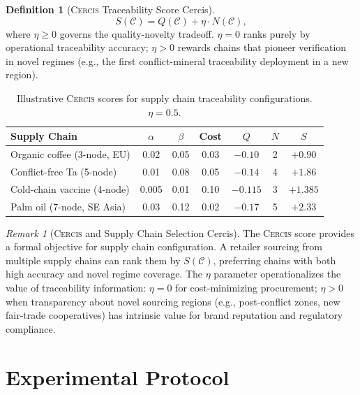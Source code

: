 \documentclass[11pt,a4paper]{article}
\theoremstyle{definition}
\newtheorem{definition}[theorem]{Definition}
\theoremstyle{remark}
\newtheorem{remark}[theorem]{Remark}
\newcommand{\Cercis}{\textsc{Cercis}}
\newcommand{\chain}{\mathcal{C}}
\begin{document}
\begin{definition}[\Cercis{} Traceability Score Cercis]
\label{def:cercis_traceability}
\begin{equation}
    S(\chain) = Q(\chain) + \eta \cdot N(\chain),
    \label{eq:cercis_traceability}
\end{equation}
where $\eta \geq 0$ governs the quality-novelty tradeoff. $\eta = 0$ ranks purely by operational traceability accuracy; $\eta > 0$ rewards chains that pioneer verification in novel regimes (e.g., the first conflict-mineral traceability deployment in a new region).
\end{definition}

\begin{table}[htbp]
\centering
\caption{Illustrative \Cercis{} scores for supply chain traceability configurations. $\eta = 0.5$.}
\label{tab:cercis_scores}
\begin{tabular}{lcccccc}
\toprule
\textbf{Supply Chain } & $\alpha$ & $\beta$ & Cost & $Q$ & $N$ & $S$ \\
\midrule
Organic coffee (3-node, EU)  & 0.02 & 0.05 & 0.03 & $-0.10$ & 2 & $+0.90$ \\
Conflict-free Ta (5-node)  & 0.01 & 0.08 & 0.05 & $-0.14$ & 4 & $+1.86$ \\
Cold-chain vaccine (4-node)  & 0.005 & 0.01 & 0.10 & $-0.115$ & 3 & $+1.385$ \\
Palm oil (7-node, SE Asia)  & 0.03 & 0.12 & 0.02 & $-0.17$ & 5 & $+2.33$ \\
\bottomrule
\end{tabular}
\end{table}

\begin{remark}[\Cercis{} and Supply Chain Selection Cercis]
\label{rem:cercis_selection}
The \Cercis{} score provides a formal objective for supply chain configuration. A retailer sourcing from multiple supply chains can rank them by $S(\chain)$, preferring chains with both high accuracy and novel regime coverage. The $\eta$ parameter operationalizes the value of traceability information: $\eta = 0$ for cost-minimizing procurement; $\eta > 0$ when transparency about novel sourcing regions (e.g., post-conflict zones, new fair-trade cooperatives) has intrinsic value for brand reputation and regulatory compliance.
\end{remark}

\section{Experimental Protocol }
\label{sec:experiment}
\end{document}
